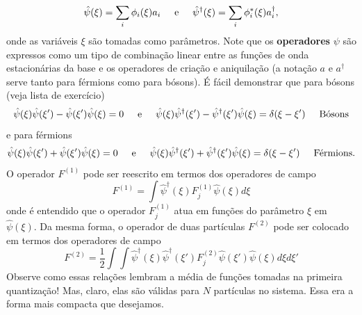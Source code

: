 \documentclass{article}
\begin{document}
\begin{equation}
    \hat{\psi}(\xi) = \sum_i \phi_i(\xi)a_i \hspace{0.5cm} \text{e} \hspace{0.5cm} \hat{\psi}^{\dagger }(\xi) = \sum_i \phi_i^{*} (\xi)a_i^\dagger,
\end{equation}
onde as variáveis $\xi$ são tomadas como parâmetros. Note que os \textbf{operadores} $\psi$ são expressos como um tipo de combinação linear entre as funções de onda estacionárias da base e os operadores de criação e aniquilação (a notação $a$ e $a^\dagger$ serve tanto para férmions como para bósons). É fácil demonstrar que para bósons (veja lista de exercício)
\begin{equation}
    \hat{\psi}(\xi)\hat{\psi}(\xi ') - \hat{\psi}(\xi ')\hat{\psi}(\xi) = 0 \hspace{0.5cm} \text{e} \hspace{0.5cm} \hat{\psi}(\xi)\hat{\psi}^\dagger (\xi ') - \hat{\psi}^\dagger (\xi ')\hat{\psi}(\xi) = \delta(\xi - \xi ') \hspace{0.5cm} \text{Bósons}
\end{equation}
e para férmions
\begin{equation}
    \hat{\psi}(\xi)\hat{\psi}(\xi ') + \hat{\psi}(\xi ')\hat{\psi}(\xi) = 0 \hspace{0.5cm} \text{e} \hspace{0.5cm} \hat{\psi}(\xi)\hat{\psi}^\dagger (\xi ') + \hat{\psi}^\dagger (\xi ')\hat{\psi}(\xi) = \delta(\xi - \xi ') \hspace{0.5cm} \text{Férmions}.
\end{equation}
O operador $F^{(1)}$ pode ser reescrito em termos dos operadores de campo
\begin{equation}
    F^{(1)} = \int \hat{\psi}^\dagger (\xi) F_j^{(1)} \hat{\psi} (\xi) d\xi
\end{equation}
onde é entendido que o operador $F_j^{(1)}$ atua em funções do parâmetro $\xi$ em $\hat{\psi}(\xi)$. Da mesma forma, o operador de duas partículas $F^{(2)}$ pode ser colocado em termos dos operadores de campo
\begin{equation}
    F^{(2)} = \frac{1}{2}\int \int \hat{\psi}^\dagger (\xi) \hat{\psi}^\dagger (\xi ') F_j^{(2)} \hat{\psi} (\xi ')\hat{\psi}(\xi) d\xi d\xi '
\end{equation}
Observe como essas relações lembram a média de funções tomadas na primeira quantização! Mas, claro, elas são válidas para $N$ partículas no sistema. Essa era a forma mais compacta que desejamos.
\end{document}
